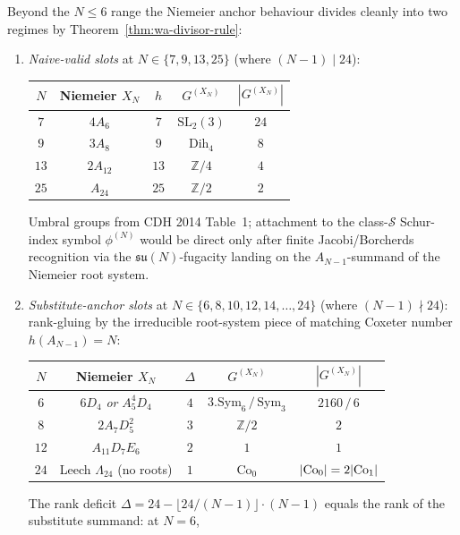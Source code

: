 \begin{remark}
\label{rem:wa-extended-N}
Beyond the $N \le 6$ range the Niemeier anchor
behaviour divides cleanly into two regimes by
Theorem~\ref{thm:wa-divisor-rule}:
\begin{enumerate}[label=\textup{(\arabic*)}]
\item \emph{Naive-valid slots} at $N \in \{7, 9, 13, 25\}$
(where $(N - 1) \mid 24$):
\begin{center}
\begin{tabular}{c|cc|cc}
$N$ & Niemeier $X_N$ & $h$ & $G^{(X_N)}$ & $|G^{(X_N)}|$ \\\hline
$7$ & $4 A_6$ & $7$ & $\mathrm{SL}_2(3)$ & $24$ \\
$9$ & $3 A_8$ & $9$ & $\mathrm{Dih}_4$ & $8$ \\
$13$ & $2 A_{12}$ & $13$ & $\mathbb{Z}/4$ & $4$ \\
$25$ & $A_{24}$ & $25$ & $\mathbb{Z}/2$ & $2$ \\
\end{tabular}
\end{center}
Umbral groups from CDH 2014 Table~1; attachment to the
class-$\mathcal S$ Schur-index symbol $\phi^{(N)}$ would be direct only
after finite Jacobi/Borcherds recognition via the
$\mathfrak{su}(N)$-fugacity landing on the $A_{N-1}$-summand of
the Niemeier root system.
\item \emph{Substitute-anchor slots} at $N \in \{6, 8, 10, 12, 14,
\ldots, 24\}$ (where $(N - 1) \nmid 24$): rank-gluing by the
irreducible root-system piece of matching Coxeter number
$h(A_{N-1}) = N$:
\begin{center}
\begin{tabular}{c|cc|cc}
$N$ & Niemeier $X_N$ & $\Delta$ & $G^{(X_N)}$ & $|G^{(X_N)}|$ \\\hline
$6$ & $6 D_4$ \emph{or} $A_5^4 D_4$ & $4$ & $3.\mathrm{Sym}_6 \,/\, \mathrm{Sym}_3$ & $2160 \,/\, 6$ \\
$8$ & $2 A_7 D_5^2$ & $3$ & $\mathbb{Z}/2$ & $2$ \\
$12$ & $A_{11} D_7 E_6$ & $2$ & $1$ & $1$ \\
$24$ & Leech $\Lambda_{24}$ (no roots) & $1$ & $\mathrm{Co}_0$ & $|{\rm Co}_0| = 2 |{\rm Co}_1|$ \\
\end{tabular}
\end{center}
The rank deficit $\Delta = 24 - \lfloor 24/(N - 1) \rfloor \cdot (N - 1)$
equals the rank of the substitute summand: at $N = 6$,

\end{enumerate}
\end{remark}
